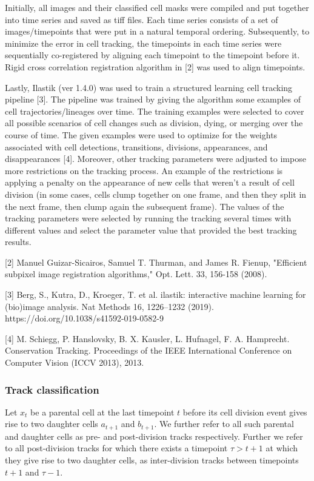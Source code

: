 \documentclass[11pt,notitlepage]{article}
\begin{document}
Initially, all images and their classified cell masks were compiled and put together into time series and saved as tiff files. Each time series consists of a set of images/timepoints that were put in a natural temporal ordering. Subsequently, to minimize the error in cell tracking, the timepoints in each time series were sequentially co-registered by aligning each timepoint to the timepoint before it. Rigid cross correlation registration algorithm in [2] was used to align timepoints.

Lastly, Ilastik (ver 1.4.0) was used to train a structured learning cell tracking pipeline [3]. The pipeline was trained by giving the algorithm some examples of cell trajectories/lineages over time. The training examples were selected to cover all possible scenarios of cell changes such as division, dying, or merging over the course of time. The given examples were used to optimize for the weights associated with cell detections, transitions, divisions, appearances, and disappearances [4].  Moreover, other tracking parameters were adjusted to impose more restrictions on the tracking process. An example of the restrictions is applying a penalty on the appearance of new cells that weren’t a result of cell division (in some cases, cells clump together on one frame, and then they split in the next frame, then clump again the subsequent frame).  The values of the tracking parameters were selected by running the tracking several times with different values and select the parameter value that provided the best tracking results.

[2] Manuel Guizar-Sicairos, Samuel T. Thurman, and James R. Fienup, "Efficient subpixel image registration algorithms," Opt. Lett. 33, 156-158 (2008).

[3] Berg, S., Kutra, D., Kroeger, T. et al. ilastik: interactive machine learning for (bio)image analysis. Nat Methods 16, 1226–1232 (2019). https://doi.org/10.1038/s41592-019-0582-9

[4] M. Schiegg, P. Hanslovsky, B. X. Kausler, L. Hufnagel, F. A. Hamprecht. Conservation Tracking. Proceedings of the IEEE International Conference on Computer Vision (ICCV 2013), 2013.

\subsubsection*{Track classification}

Let $x_t$ be a parental cell at the last timepoint $t$ before its cell division event gives rise to two daughter cells $a_{t+1}$ and $b_{t+1}$. We further refer to all such parental and daughter cells as pre- and post-division tracks respectively. Further we refer to all post-division tracks for which there exists a timepoint $\tau > t+1$ at which they give rise to two daughter cells, as inter-division tracks between timepoints $t+1$ and $\tau - 1$.
\end{document}
